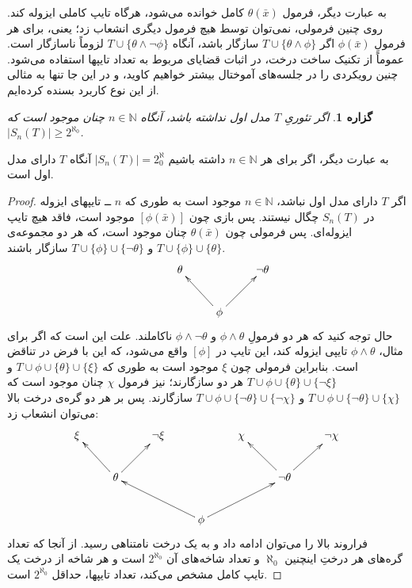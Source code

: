 \documentclass[12pt,a4paper]{report}
\theoremstyle{colorhead}
\newtheorem{prop}[thm]{گزاره}
\begin{document}
به عبارت دیگر، فرمول
$\theta(\bar{x})$
کامل خوانده می‌شود، هرگاه تایپ کاملی ایزوله کند. روی چنین فرمولی، نمی‌توان توسط هیچ فرمول دیگری انشعاب زد؛ یعنی، برای هر فرمولِ 
$\phi(\bar{x})$
اگر
$T\cup \{\theta\wedge \phi\}$
سازگار باشد، آنگاه 
$T\cup \{\theta\wedge\neg\phi\}$
لزوماً ناسازگار است. عموماً از تکنیک ساخت درخت، در اثبات قضایای مربوط به تعداد تایپها استفاده می‌شود. چنین رویکردی را در جلسه‌های آموختال بیشتر خواهیم کاوید، و در این جا تنها به مثالی از این نوع کاربرد بسنده کرده‌ایم. 
\begin{prop}
\label{deraxt1}
اگر تئوریِ
$T$
مدل اول نداشته باشد، آنگاه 
$n\in \mathbb{N}$
چنان موجود است که 
\mbox{$|S_n(T)|\geq 2^{\aleph_0}$}.
\end{prop}
به عبارت دیگر، اگر برای هر
$n\in \mathbb{N}$
داشته باشیم
$|S_n(T)|=2^\aleph_0$
آنگاه 
$T$
دارای مدل اول است.
\begin{proof}
اگر
$T$
دارای مدل اول نباشد،
$n\in \mathbb{N}$
موجود است به طوری که 
$n$ ــ
تایپهای ایزوله در
$S_n(T)$
چگال نیستند. پس بازی چون
$[\phi(\bar{x})]$
موجود است، فاقد هیچ تایپ ایزوله‌ای. پس فرمولی چون
$\theta(\bar{x})$
چنان موجود است،  که هر دو مجموعه‌ی
$T\cup \{\phi\}\cup \{\theta\}$
و
$T\cup\{\phi\}\cup \{\neg\theta\}$
سازگار باشند.
\[
\xymatrix{
& \theta & & \neg\theta\\
&& \phi \ar[ul]\ar[ur]
}
\]
حال توجه کنید که هر دو فرمولِ
$\phi\wedge\theta$
و 
$\phi\wedge\neg \theta$
ناکاملند. علت این است که اگر برای مثال،
$\phi\wedge \theta$
تایپی ایزوله کند، این تایپ در
$[\phi]$
واقع می‌شود، که این با فرض در تناقض است. بنابراین فرمولی چون
$\xi$
موجود است به طوری که 
$T\cup \phi\cup \{\theta\}\cup \{\xi\}$
و
$T\cup\phi\cup \{\theta\}\cup \{\neg \xi\}$
هر دو سازگارند؛‌ نیز فرمول
$\chi$
چنان موجود است که 
$T\cup\phi\cup \{\neg \theta\}\cup \{ \chi\}$
و
$T\cup\phi\cup \{\neg \theta\}\cup \{\neg \chi\}$
سازگارند. پس
 بر هر دو گره‌ی درخت بالا می‌توان انشعاب زد:
\[
\xymatrix{
\xi & & \neg \xi& & \chi & & \neg \chi\\
 & \theta\ar[ul]\ar[ur] & & & & \neg\theta\ar[ul]\ar[ur]& \\
 & & & \phi\ar[ull]\ar[urr]& & & \\
}
\]
فراروند بالا را می‌توان ادامه داد و به یک درخت نامتناهی رسید. از آنجا که تعداد گره‌های هر درختِ اینچنین
$\aleph_0$
و
تعداد شاخه‌های آن
$2^{\aleph_0}$
است و هر شاخه از درخت یک تایپ کامل مشخص می‌کند، تعداد تایپها، حداقل
$2^{\aleph_0}$
است.
\end{proof}
\pagebreak
\end{document}
